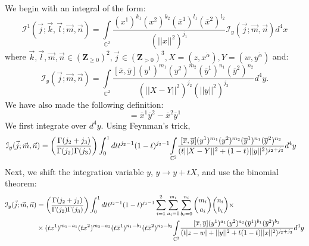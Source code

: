 \documentclass[../main.tex]{subfiles}
\begin{document}
We begin with an integral of the form:
\begin{equation}
    \mathcal{I}^1(\vec{j};\vec{k},\vec{l};\vec{m}, \vec{n}) = \underset{\mathbb{C}^2}{\int} \frac{ (x^1)^{k_1} (x^2)^{k_2}  (\overline{x}^1)^{l_1} (\overline{x}^2)^{l_2}}{(\vert \vert x \vert \vert^2)^{j_1}} \mathcal{I}_y (\vec{j};\vec{m}, \vec{n}) d^4x \label{eq:main type 1}
\end{equation}
where $\vec{k},\vec{l},\vec{m},\vec{n} \in (\mathbf{Z}_{\geq 0})^2, \vec{j} \in (\mathbf{Z}_{>0})^3, X = (z,x^{\dot{\alpha}}), Y = (w,y^{\dot{\alpha}})$ and:  
\begin{equation}
    \mathcal{I}_y (\vec{j};\vec{m}, \vec{n}) = \underset{\mathbb{C}^2}{\int} \frac{[\overline{x},\overline{y}] (y^1)^{m_1} (y^2)^{m_2} (\overline{y}^1)^{n_1} (\overline{y}^2)^{n_2}}{(\vert \vert X-Y \vert \vert^2)^{j_2} (\vert \vert y \vert \vert^2)^{j_3}} d^4y.
\end{equation}
We have also made the following definition: 
\begin{equation}
    [\overline{x},\overline{y}] = \overline{x}^1 \overline{y}^2 - \overline{x}^2 \overline{y}^1
\end{equation}
We first integrate over $d^4 y$. Using Feynman's trick,
\begingroup \allowdisplaybreaks \begin{align}
    \mathcal{I}_y (\vec{j};\vec{m}, \vec{n}) &= \bigg( \frac{\Gamma(j_2+j_3)}{\Gamma(j_2) \Gamma(j_3)} \bigg) \int_0^1 dt t^{j_2-1} (1-t)^{j_3-1} \underset{\mathbb{C}^2}{\int} \frac{[\overline{x},\overline{y}] (y^1)^{m_1} (y^2)^{m_2} (\overline{y}^1)^{n_1} (\overline{y}^2)^{n_2}}{(t\vert \vert X-Y \vert \vert^2 + (1-t) \vert \vert y \vert \vert^2)^{j_2+j_3}} d^4y \notag
\end{align} \endgroup
Next, we shift the integration variable $y$, $y \to y+tX$, and use the binomial theorem:
\begingroup \allowdisplaybreaks \begin{align}
    \mathcal{I}_y (\vec{j};\vec{m}, \vec{n}) &= \bigg( \frac{\Gamma(j_2+j_3)}{\Gamma(j_2) \Gamma(j_3)} \bigg) \int_0^1 dt t^{j_2-1} (1-t)^{j_3-1} \sum_{i=1}^{2} \sum_{a_i = 0}^{m_i} \sum_{b_i = 0}^{n_i} {m_i \choose a_i} {n_i \choose b_i} \times \label{eq. type 1 eq 2}\\
    &\times (tx^1)^{m_1-a_1}(tx^2)^{m_2-a_2} (t\overline{x}^1)^{n_1-b_1}(t\overline{x}^2)^{n_2-b_2} \underset{\mathbb{C}^3}{\int} \frac{[\overline{x},\overline{y}] (y^1)^{a_1} (y^2)^{a_2}(\overline{y}^1)^{b_1} (\overline{y}^2)^{b_2}}{(t\vert z-w \vert + \vert \vert y \vert \vert^2+t(1-t)\vert \vert x \vert \vert^2)^{j_2+j_3}} d^4y \notag
\end{align} \endgroup
\end{document}
